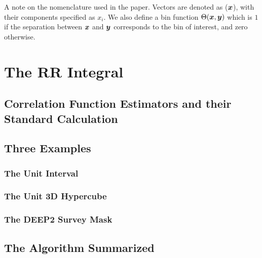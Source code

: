 \documentclass[usenatbib]{mn2e}
\begin{document}
A note on the nomenclature used in the paper. Vectors are denoted as (${\bm x}$),
with their components specified as $x_{i}$. We also define a bin function
$\Theta({\bm x},{\bm y})$ which is $1$ if the separation between ${\bm x}$ and ${\bm y}$
corresponds to the bin of interest, and zero otherwise. 

\section{The RR Integral}
\label{sec:RR}

\subsection{Correlation Function Estimators and their Standard Calculation}

\subsection{Three Examples}

\subsubsection{The Unit Interval}

\subsubsection{The Unit 3D Hypercube}

\subsubsection{The DEEP2 Survey Mask}

\subsection{The Algorithm Summarized}
\label{sec:alg}
\end{document}
